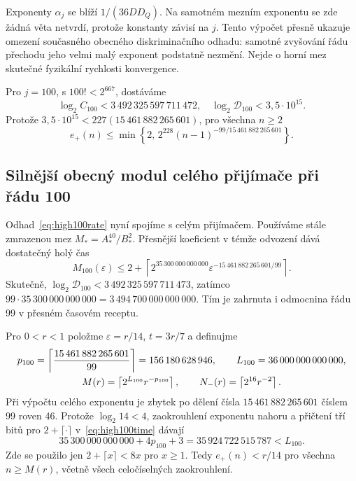 \documentclass[11pt,a4paper]{article}
\theoremstyle{remark}\newtheorem{remark}[theorem]{Poznámka}
\numberwithin{equation}{section}
\begin{document}
Exponenty \(\alpha_j\) se blíží \(1/(36DD_Q)\). Na samotném mezním exponentu se zde žádná věta netvrdí, protože konstanty závisí na \(j\). Tento výpočet přesně ukazuje omezení současného obecného diskriminačního odhadu: samotné zvyšování řádu přechodu jeho velmi malý exponent podstatně nezmění. Nejde o horní mez skutečné fyzikální rychlosti konvergence.

Pro \(j=100\), s \(100!<2^{667}\), dostáváme
\[
\log_2C_{100}<3\,492\,325\,597\,711\,472,
\quad
\log_2\mathcal D_{100}<3{,}5\cdot10^{15}.
\]
Protože \(3{,}5\cdot10^{15}<227(15\,461\,882\,265\,601)\), pro všechna \(n\ge2\)
\begin{equation}
\boxed{e_+(n)\le\min\left\{2,\,
2^{228}(n-1)^{-99/15\,461\,882\,265\,601}\right\}.}
\label{eq:high100rate}
\end{equation}

\subsection{Silnější obecný modul celého přijímače při řádu 100}

Odhad~\eqref{eq:high100rate} nyní spojíme s celým přijímačem. Používáme stále zmrazenou mez \(M_*=A_*^{40}/B_*^2\). Přesnější koeficient v témže odvození dává dostatečný holý čas
\begin{equation}
M_{100}(\varepsilon)\le
2+\left\lceil2^{35\,300\,000\,000\,000}
\varepsilon^{-15\,461\,882\,265\,601/99}\right\rceil.
\label{eq:high100time}
\end{equation}
Skutečně, \(\log_2\mathcal D_{100}<3\,492\,325\,597\,711\,473\), zatímco
\(99\cdot35\,300\,000\,000\,000=3\,494\,700\,000\,000\,000\).
Tím je zahrnuta i odmocnina řádu 99 v přesném časovém receptu.

Pro \(0<r<1\) položme \(\varepsilon=r/14\), \(t=3r/7\) a definujme
\begin{gather}
p_{100}=\left\lceil{15\,461\,882\,265\,601\over99}\right\rceil
=156\,180\,628\,946,\qquad
L_{100}=36\,000\,000\,000\,000,\notag\\
M(r)=\left\lceil2^{L_{100}}r^{-p_{100}}\right\rceil,
\qquad N_-(r)=\left\lceil2^{16}r^{-2}\right\rceil.
\label{eq:high100aux}
\end{gather}
Při výpočtu celého exponentu je zbytek po dělení čísla
\(15\,461\,882\,265\,601\) číslem 99 roven 46.
Protože \(\log_2 14<4\), zaokrouhlení exponentu nahoru a přičtení tří bitů pro \(2+\lceil\cdot\rceil\) v~\eqref{eq:high100time} dávají
\[
35\,300\,000\,000\,000+4p_{100}+3
=35\,924\,722\,515\,787<L_{100}.
\]
Zde se použilo jen \(2+\lceil x\rceil<8x\) pro \(x\ge1\).
Tedy \(e_+(n)<r/14\) pro všechna \(n\ge M(r)\), včetně všech celočíselných zaokrouhlení.
\end{document}
